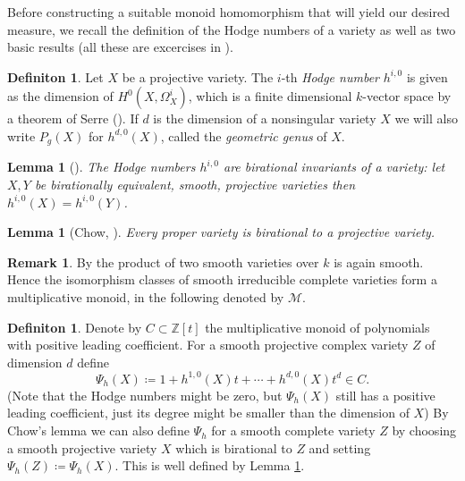 \documentclass[11pt, a4paper, german]{article}
\theoremstyle{plain}
\newtheorem{lemma}[theorem]{Lemma}
\theoremstyle{definition}
\newtheorem{definition}[theorem]{Definiton}
\newtheorem{remark}[theorem]{Remark}
\begin{document}
Before constructing a suitable monoid homomorphism that will yield our desired measure, we recall the definition of the Hodge numbers
of a variety as well as two basic results (all these are excercises in \cite[Ch. II]{Ha}).

\begin{definition}
    Let $X$ be a projective variety. The $i$-th \emph{Hodge number} $h^{i,0}$ is given as the dimension of $H^0(X,\Omega^i_X)$, 
    which is a finite dimensional $k$-vector space by a theorem of Serre (\cite[§3 Prop. 7]{FAC}).
    If $d$ is the dimension of a nonsingular variety $X$ we will also write $P_g(X)$ for $h^{d,0}(X)$, called the \emph{geometric genus} of $X$.
\end{definition}

\begin{lemma}[{\cite[II Ex. 8.8]{Ha}}]
    \label{bir}
    The Hodge numbers $h^{i,0}$ are birational invariants of a variety: let $X, Y$ be birationally equivalent, smooth, projective varieties
    then $h^{i,0}(X) = h^{i,0}(Y)$.
\end{lemma}

\begin{lemma}[Chow, {\cite[II Ex. 4.10]{Ha}}]
    Every proper variety is birational to a projective variety.
\end{lemma}

\begin{remark}
    By \cite[Prop. 10.1 (d)]{Ha} the product of two smooth varieties over $k$ is again smooth. Hence the isomorphism classes of smooth
    irreducible complete varieties form a multiplicative monoid, in the following denoted by $\mathcal{M}$.
\end{remark}
\begin{definition}
    Denote by $C \subset \mathbb{Z}[t]$ the multiplicative monoid of polynomials with positive leading coefficient.
    For a smooth projective complex variety $Z$ of dimension $d$ define
    \[
        \Psi_h(X) \coloneqq1 + h^{1,0}(X)t + \cdots + h^{d,0}(X)t^d \in C.
    \]
    (Note that the Hodge numbers might be zero, but $\Psi_h(X)$ still has a positive leading coefficient, 
    just its degree might be smaller than the dimension of $X$)
    By Chow's lemma we can also define $\Psi_h$ for a smooth complete variety $Z$ by choosing a smooth projective variety $X$ which is birational
    to $Z$ and setting $\Psi_h(Z) \coloneqq \Psi_h(X)$. This is well defined by Lemma \ref{bir}.
\end{definition}
\end{document}
